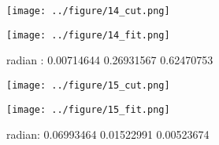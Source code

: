 \documentclass{article}
\begin{document}
\begin{figure}[H]
\begin{minipage}{0.48\linewidth}
  \centerline{\texttt{[image: ../figure/14\_cut.png]}}
\end{minipage}
\hfill
\begin{minipage}{0.48\linewidth}
  \centerline{\texttt{[image: ../figure/14\_fit.png]}}
\end{minipage}
\caption{radian : 0.00714644 0.26931567 0.62470753}
\end{figure}


\begin{figure}[H]
\begin{minipage}{0.48\linewidth}
  \centerline{\texttt{[image: ../figure/15\_cut.png]}}
\end{minipage}
\hfill
\begin{minipage}{0.48\linewidth}
  \centerline{\texttt{[image: ../figure/15\_fit.png]}}
\end{minipage}
\caption{radian: 0.06993464 0.01522991 0.00523674}
\end{figure}
\end{document}
